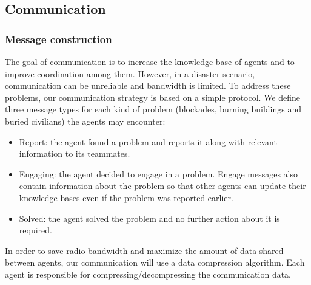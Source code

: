 \subsection{Communication}
\label{sec:communication}

\subsubsection{Message construction}
The goal of communication is to increase the knowledge base of agents and to improve coordination among them. However, in a disaster scenario, communication can be unreliable and bandwidth is limited. To address these problems, our communication strategy is based on a simple protocol. We define three message types for each kind of problem (blockades, burning buildings and buried civilians) the agents may encounter:

\begin{itemize}
 \item Report: the agent found a problem and reports it along with relevant information to its teammates. %

 \item Engaging: the agent decided to engage in a problem. Engage messages also contain information about the problem so that other agents can update their knowledge bases even if the problem was reported earlier.

 \item Solved: the agent solved the problem and no further action about it is required. %
\end{itemize}


In order to save radio bandwidth and maximize the amount of data shared between agents, our communication will use a data compression algorithm. Each agent is responsible for compressing/decompressing the communication data.


